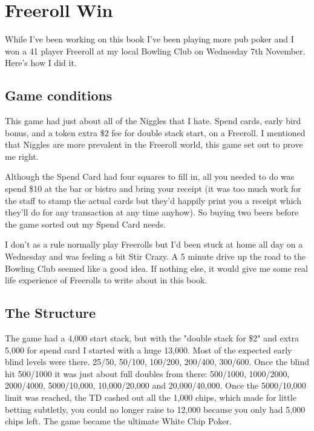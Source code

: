 \chapter{Freeroll Win}


While I've been working on this book I've been playing more
pub poker and I won a 41 player Freeroll at my local
Bowling Club on Wednesday 7th November. Here's how I
did it.

\section{Game conditions}

This game had just about all of the Niggles that I hate.
Spend cards, early bird bonus, and a token extra \$2 fee
for double stack start, on a Freeroll. I mentioned that
Niggles are more prevalent in the Freeroll world, this
game set out to prove me right.

Although the Spend Card had four squares to fill in, all you
needed to do was spend \$10 at the bar or bistro and bring your
receipt (it was too much work for the staff to stamp the actual
cards but they'd happily print you a receipt which they'll do
for any transaction at any time anyhow). So buying two beers
before the game sorted out my Spend Card needs.

I don't as a rule normally play Freerolls but I'd been stuck
at home all day on a Wednesday and was feeling a bit Stir Crazy.
A 5 minute drive up the road to the Bowling Club seemed like
a good idea. If nothing else, it would give me some real life
experience of Freerolls to write about in this book.

\section{The Structure}

The game had a 4,000 start stack, but with the "double stack for \$2"
and extra 5,000 for spend card I started with a huge 13,000. Most of
the expected early blind levels were there. 25/50, 50/100, 100/200, 200/400,
300/600. Once the blind hit 500/1000 it was just about full doubles
from there: 500/1000, 1000/2000, 2000/4000, 5000/10,000, 10,000/20,000
and 20,000/40,000. Once the 5000/10,000 limit was reached, the TD cashed out
all the 1,000 chips, which made for little betting subtletly, you could
no longer raise to 12,000 because you only had 5,000 chips left. The game
became the ultimate White Chip Poker.

